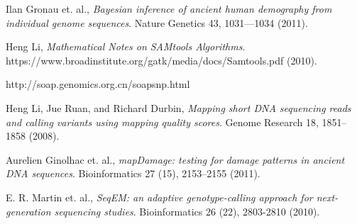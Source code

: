 \documentclass{article}
\begin{document}
\begin{thebibliography}{9}

  Ilan Gronau et. al.,
  \emph{Bayesian inference of ancient human demography from individual genome sequences}.
  Nature Genetics 43, 1031---1034 (2011).

  Heng Li,
  \emph{Mathematical Notes on SAMtools Algorithms}.
  https://www.broadinstitute.org/gatk/media/docs/Samtools.pdf (2010).

  http://soap.genomics.org.cn/soapsnp.html

  Heng Li, Jue Ruan, and Richard Durbin,
  \emph{Mapping short DNA sequencing reads and calling variants using mapping quality scores}.
  Genome Research 18, 1851--1858 (2008). 

  Aurelien Ginolhac et. al.,
  \emph{mapDamage: testing for damage patterns in ancient DNA sequences}.
  Bioinformatics 27 (15), 2153--2155 (2011).

  E. R. Martin et. al.,
  \emph{SeqEM: an adaptive genotype-calling approach for next-generation
  sequencing studies}.
  Bioinformatics 26 (22), 2803-2810 (2010).
\end{thebibliography}
\end{document}
